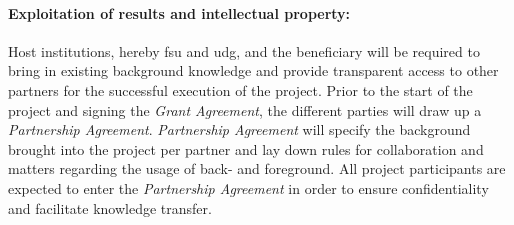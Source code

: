 
\paragraph{Exploitation of results and intellectual property:}

Host institutions, hereby \ac{fsu} and \ac{udg}, and the beneficiary will be required to bring in existing background knowledge and provide transparent access to other partners for the successful execution of the project.
Prior to the start of the project and signing the \emph{Grant Agreement}, the different parties will draw up a \emph{Partnership Agreement}.
\emph{Partnership Agreement} will specify the background brought into the project per partner and lay down rules for collaboration and matters regarding the usage of back- and foreground.
All project participants are expected to enter the \emph{Partnership Agreement} in order to ensure confidentiality and facilitate knowledge transfer.


